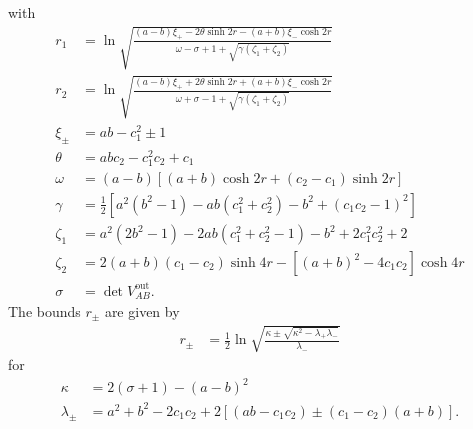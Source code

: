 \documentclass[%
 reprint,
 superscriptaddress,
 amsmath,
 amssymb,
 aps,
 pra,
]{revtex4-2}
\begin{document}
\begin{widetext}
with
\begin{align}
    r_1 &= \ln \sqrt{\frac{(a-b)\xi_+ - 2\theta\sinh2r - (a+b)\xi_- \cosh2r}{\omega - \sigma + 1 + \sqrt{\gamma (\zeta_1 + \zeta_2)}}} \\
    r_2 &= \ln \sqrt{\frac{(a-b)\xi_+ + 2\theta\sinh2r + (a+b)\xi_- \cosh2r}{\omega + \sigma - 1 + \sqrt{\gamma (\zeta_1 + \zeta_2)}}} \\
    \xi_\pm &= ab - c_1^2 \pm 1 \\
    \theta &= abc_2 - c_1^2c_2 + c_1 \\
    \omega &= (a - b)\left[ (a + b) \cosh2r + (c_2 - c_1)\sinh2r \right] \\
    \gamma &= \frac{1}{2} \left[ a^2 (b^2 - 1) - ab(c_1^2 + c_2^2) - b^2 + (c_1c_2 - 1)^2 \right] \\
    \zeta_1 &= a^2 (2b^2 - 1) - 2ab(c_1^2 + c_2^2 - 1) - b^2 + 2c_1^2c_2^2 + 2 \\
    \zeta_2 &= 2(a+b)(c_1 - c_2)\sinh4r - \left[ (a+b)^2 - 4c_1c_2 \right]\cosh4r \\
    \sigma &= \det V_{AB}^\mathrm{out}.
\end{align}
The bounds $r_\pm$ are given by \cite{tserkis_quantifying_2017}
\begin{align}
    r_\pm &= \frac{1}{2} \ln \sqrt{\frac{\kappa \pm \sqrt{\kappa^2 - \lambda_+ \lambda_-}}{\lambda_-}}
\end{align}
for
\begin{align}
    \kappa &= 2(\sigma + 1) - (a - b)^2 \\
    \lambda_\pm &= a^2 + b^2 - 2 c_1 c_2 + 2\left[ (ab - c_1c_2) \pm (c_1 - c_2)(a + b) \right].
\end{align}


\end{widetext}
\end{document}
